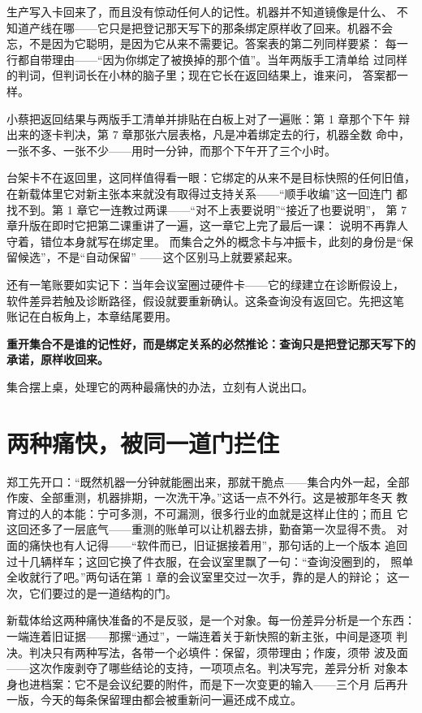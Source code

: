 生产写入卡回来了，而且没有惊动任何人的记性。机器并不知道镜像是什么、
不知道产线在哪——它只是把登记那天写下的那条绑定原样收了回来。机器不会
忘，不是因为它聪明，是因为它从来不需要记。答案表的第二列同样要紧：
每一行都自带理由——“因为你绑定了被换掉的那个值”。当年两版手工清单给
过同样的判词，但判词长在小林的脑子里；现在它长在返回结果上，谁来问，
答案都一样。

小蔡把返回结果与两版手工清单并排贴在白板上对了一遍账：第 1 章那个下午
辩出来的逐卡判决，第 7 章那张六层表格，凡是冲着绑定去的行，机器全数
命中，一张不多、一张不少——用时一分钟，而那个下午开了三个小时。

台架卡不在返回里，这同样值得看一眼：它绑定的从来不是目标快照的任何旧值，
在新载体里它对新主张本来就没有取得过支持关系——“顺手收编”这一回连门
都找不到。第 1 章它一连教过两课——“对不上表要说明”“接近了也要说明”，
第 7 章升版在即时它把第二课重讲了一遍，这一章它上完了最后一课：
说明不再靠人守着，错位本身就写在绑定里。
而集合之外的概念卡与冲振卡，此刻的身份是“保留候选”，不是“自动保留”
——这个区别马上就要紧起来。

还有一笔账要如实记下：当年会议室圈过硬件卡——它的绿建立在诊断假设上，
软件差异若触及诊断路径，假设就要重新确认。这条查询没有返回它。先把这笔
账记在白板角上，本章结尾要用。

\textbf{重开集合不是谁的记性好，而是绑定关系的必然推论：查询只是把登记那天写下的承诺，原样收回来。}

集合摆上桌，处理它的两种最痛快的办法，立刻有人说出口。

\section{两种痛快，被同一道门拦住}

郑工先开口：“既然机器一分钟就能圈出来，那就干脆点——集合内外一起，全部
作废、全部重测，机器排期，一次洗干净。”这话一点不外行。这是被那年冬天
教育过的人的本能：宁可多测，不可漏测，很多行业的血就是这样止住的；而且
它这回还多了一层底气——重测的账单可以让机器去排，勤奋第一次显得不贵。
对面的痛快也有人记得——“软件而已，旧证据接着用”，那句话的上一个版本
追回过十几辆样车；这回它换了件衣服，在会议室里飘了一句：“查询没圈到的，
照单全收就行了吧。”两句话在第 1 章的会议室里交过一次手，靠的是人的辩论；
这一次，它们要过的是一道结构的门。

新载体给这两种痛快准备的不是反驳，是一个对象。每一份差异分析是一个东西：
一端连着旧证据——那摞“通过”，一端连着关于新快照的新主张，中间是逐项
判决。判决只有两种写法，各带一个必填件：保留，须带理由；作废，须带
波及面——这次作废剥夺了哪些结论的支持，一项项点名。判决写完，差异分析
对象本身也进档案：它不是会议纪要的附件，而是下一次变更的输入——三个月
后再升一版，今天的每条保留理由都会被重新问一遍还成不成立。

